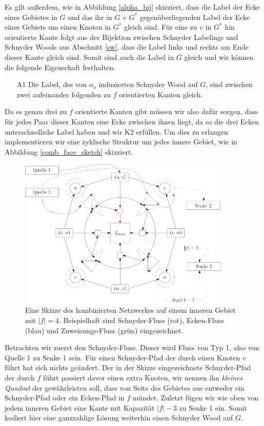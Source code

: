 Es gilt außerdem, wie in Abbildung \ref{alpha_bij} skizziert, dass die Label der Ecke eines Gebietes in $G$ und das ihr in $G+G^*$ gegenüberliegenden Label der Ecke eines Gebiets um einen Knoten in $G^*$ gleich sind. Für eine zu $v$ in $G^*$ hin orientierte Kante folgt aus der Bijektion zwischen Schnyder Labelings und Schnyder Woods aus Abschnitt \ref{sw}, dass die Label links und rechts am Ende dieser Kante gleich sind. Somit sind auch die Label in $G$ gleich und wir können die folgende Eigenschaft festhalten.
\begin{itemize}
\item [A1] Die Label, des von $\alpha_s$ induzierten Schnyder Wood auf $G$, sind zwischen zwei aufeinander folgenden zu $f$ orientierten Kanten gleich.
\end{itemize}
Da es genau drei zu $f$ orientierte Kanten gibt müssen wir also dafür sorgen, dass für jedes Paar dieser Kanten eine Ecke zwischen ihnen liegt, da so die drei Ecken unterschiedliche Label haben und wir K2 erfüllen. Um dies zu erlangen implementieren wir eine zyklische Struktur um jedes innere Gebiet, wie in Abbildung \ref{comb_face_sketch} skizziert.\\

\begin{figure}[h]
	\centering
  	\includegraphics[width=0.9\textwidth]{combined_face_sketch.png}
  	\caption{Eine Skizze des kombinierten Netzwerkes auf einem inneren Gebiet mit $|f| = 4$. Beispielhaft sind Schnyder-Fluss (rot), Ecken-Fluss (blau) und Zuweisungs-Fluss (grün) eingezeichnet. }
	\label{combined_face_sketch}
\end{figure}

Betrachten wir zuerst den Schnyder-Fluss. Dieser wird Fluss von Typ 1, also von Quelle 1 zu Senke 1 sein. Für einen Schnyder-Pfad der durch einen Knoten $v$ führt hat sich nichts geändert. Der in der Skizze eingezeichnete Schnyder-Pfad der durch $f$ führt passiert davor einen extra Knoten, wir nennen ihn \textit{kleines Quadrat} der gewährleisten soll, dass von Seite des Gebietes aus entweder ein Schnyder-Pfad oder ein Ecken-Pfad in $f$ mündet. Zuletzt fügen wir wie oben von jedem inneren Gebiet eine Kante mit Kapazität $|f|-3$ zu Senke 1 ein. Somit kodiert hier eine ganzzahlige Lösung weiterhin einen Schnyder Wood auf $G$.\

